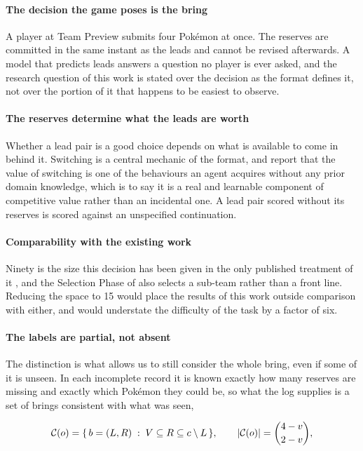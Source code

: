 \documentclass[conference]{IEEEtran}
\begin{document}
\paragraph{The decision the game poses is the bring} A player at Team Preview
submits four Pok\'emon at once. The reserves are committed in the same instant
as the leads and cannot be revised afterwards. A model that predicts leads
answers a question no player is ever asked, and the research question of this
work is stated over the decision as the format defines it, not over the portion
of it that happens to be easiest to observe.

\paragraph{The reserves determine what the leads are worth} Whether a lead pair
is a good choice depends on what is available to come in behind it. Switching
is a central mechanic of the format, and \cite{simoes2020} report that the
value of switching is one of the behaviours an agent acquires without any prior
domain knowledge, which is to say it is a real and learnable component of
competitive value rather than an incidental one. A lead pair scored without its
reserves is scored against an unspecified continuation.

\paragraph{Comparability with the existing work} Ninety is the size
this decision has been given in the only published treatment of it
\cite{angliss2026}, and the Selection Phase of \cite{reis2021} also selects
a sub-team rather than a front line. Reducing the space to 15 would place the
results of this work outside comparison with either, and would understate the
difficulty of the task by a factor of six.

\paragraph{The labels are partial, not absent} The distinction is what allows us to still consider the whole bring, even if some of it is unseen. In each incomplete record it is known exactly how many reserves
are missing and exactly which Pokémon they could be, so what the log supplies
is a set of brings consistent with what was seen,

\begin{equation}
\mathcal{C}(o) = \{\, b = (L, R) \;:\; V \subseteq R \subseteq c \setminus L \,\},\\
\qquad |\mathcal{C}(o)| = \binom{4-v}{2-v} ,
\label{eq:consistent}
\end{equation}
\end{document}
